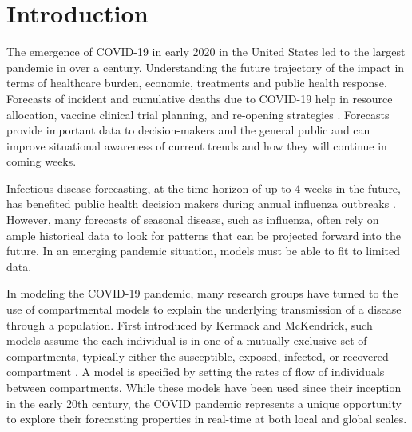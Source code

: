 \documentclass[11pt]{amsart}
\begin{document}




\section{Introduction}

The emergence of COVID-19 in early 2020 in the United States led to the largest pandemic in over a century. Understanding the future trajectory of the impact in terms of healthcare burden, economic, treatments and public health response. Forecasts of incident and cumulative deaths due to COVID-19 help in resource allocation, vaccine clinical trial planning, and re-opening strategies \cite{ray2020ensemble}. Forecasts provide important data to decision-makers and the general public and can improve situational awareness of current trends and how they will continue in coming weeks. 

Infectious disease forecasting, at the time horizon of up to 4 weeks in the future, has benefited public health decision makers during annual influenza outbreaks \cite{lutz2019applying,myers2000forecasting}.  However, many forecasts of seasonal disease, such as influenza, often rely on ample historical data to look for patterns that can be projected forward into the future. In an emerging pandemic situation, models must be able to fit to limited data. 

In modeling the COVID-19 pandemic, many research groups have turned to the use of compartmental models to explain the underlying transmission of a disease through a population. First introduced by  Kermack and McKendrick, such models assume the each individual is in one of a mutually exclusive set of compartments, typically either the susceptible, exposed, infected, or recovered compartment \cite{kermack1927contribution}. A model is specified by setting the rates of flow of individuals between compartments. While these models have been used since their inception in the early 20th century, the COVID pandemic represents a unique opportunity to explore their forecasting properties in real-time at both local and global scales.
 
\end{document}
